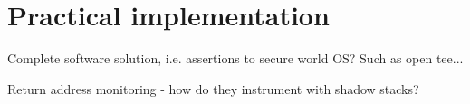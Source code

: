 \section{Practical implementation}

Complete software solution, i.e. assertions to secure world OS? Such as open tee... 

Return address monitoring - how do they instrument with shadow stacks?

